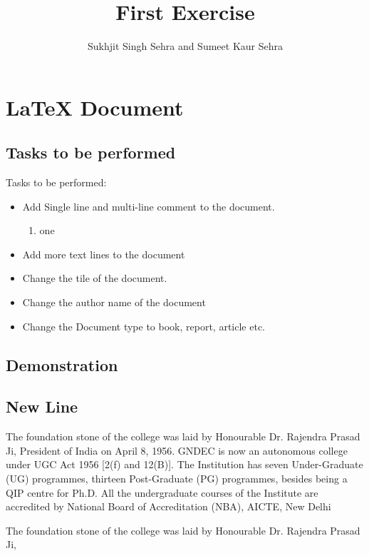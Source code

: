 \documentclass[12pt, letterpaper, twoside]{book}
\title{First Exercise}
\author{Sukhjit Singh Sehra and Sumeet Kaur Sehra}
\begin{document}
\maketitle

\chapter{LaTeX Document}
\section{Tasks to be performed}
Tasks to be performed:
\begin{itemize}
	\item Add Single line and multi-line comment to the document.
	\begin{enumerate}
		\item one
		\end{enumerate}
	
    \item Add more text lines to the document
    \item Change the tile of the document.
   \item Change the author name of the document
   \item Change the Document type to book, report, article etc.
\end{itemize}
\section*{Demonstration}

\section{New Line}
The foundation stone of the college was laid by Honourable Dr. Rajendra Prasad Ji, President of India on April 8, 1956. GNDEC is now an autonomous college under UGC Act 1956 [2(f) and 12(B)]. The Institution has seven Under-Graduate (UG) programmes, thirteen Post-Graduate (PG) programmes, besides being a QIP centre for Ph.D. All the undergraduate courses of the Institute are accredited by  National Board of Accreditation (NBA), AICTE, New Delhi

The foundation stone of the college was laid by Honourable Dr. Rajendra Prasad Ji,
\end{document}
